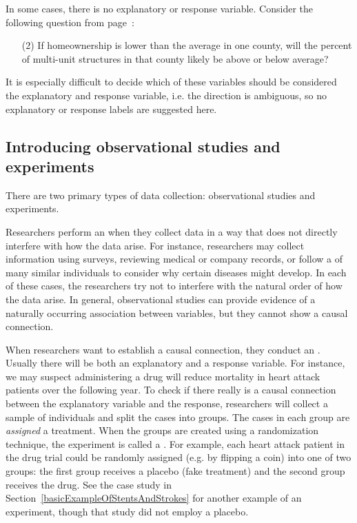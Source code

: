 In some cases, there is no explanatory or response variable. Consider the following question from page~\pageref{ownershipMultiUnitQuestion}:
\begin{enumerate}
\item[(2)] 
	If homeownership is lower than the average in one county, will the percent of multi-unit structures in that county likely be above or below average?
\end{enumerate}
It is especially difficult to decide which of these variables should be considered the explanatory and response variable, %
i.e. the direction is ambiguous, so no explanatory or response labels are suggested here.


\subsection{Introducing observational studies and experiments}

There are two primary types of data collection: observational studies and experiments.

Researchers perform an  when they collect data in a way that does not directly interfere with how the data arise. For instance, researchers may collect information using surveys, reviewing medical or company records, or follow a  of many similar individuals to consider why certain diseases might develop. In each of these cases, the researchers try not to interfere with the natural order of how the data arise. In general, observational studies can provide evidence of a naturally occurring association between variables, but they cannot show a causal connection.

When researchers want to establish a causal connection, they conduct an . Usually there will be both an explanatory and a response variable. For instance, we may suspect administering a drug will reduce mortality in heart attack patients over the following year. To check if there really is a causal connection between the explanatory variable and the response, researchers will collect a sample of individuals and split the cases into groups. The cases in each group are \emph{assigned} a treatment. When the groups are created using a randomization technique, the experiment is called a . For example, each heart attack patient in the drug trial could be randomly assigned (e.g. by flipping a coin) into one of two groups: the first group receives a placebo (fake treatment) and the second group receives the drug. See the case study in Section~\ref{basicExampleOfStentsAndStrokes} for another example of an experiment, though that study did not employ a placebo.

